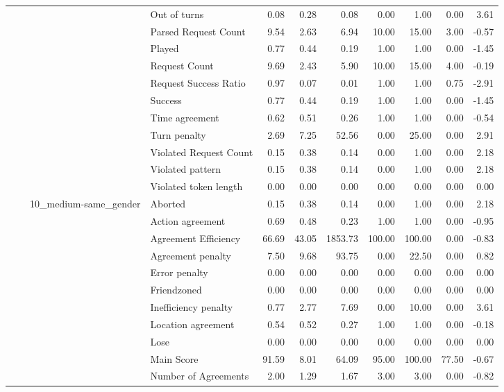 \begin{tabular}{llllrrrrrrr}
 &  &  & Out of turns & 0.08 & 0.28 & 0.08 & 0.00 & 1.00 & 0.00 & 3.61 \\
 &  &  & Parsed Request Count & 9.54 & 2.63 & 6.94 & 10.00 & 15.00 & 3.00 & -0.57 \\
 &  &  & Played & 0.77 & 0.44 & 0.19 & 1.00 & 1.00 & 0.00 & -1.45 \\
 &  &  & Request Count & 9.69 & 2.43 & 5.90 & 10.00 & 15.00 & 4.00 & -0.19 \\
 &  &  & Request Success Ratio & 0.97 & 0.07 & 0.01 & 1.00 & 1.00 & 0.75 & -2.91 \\
 &  &  & Success & 0.77 & 0.44 & 0.19 & 1.00 & 1.00 & 0.00 & -1.45 \\
 &  &  & Time agreement & 0.62 & 0.51 & 0.26 & 1.00 & 1.00 & 0.00 & -0.54 \\
 &  &  & Turn penalty & 2.69 & 7.25 & 52.56 & 0.00 & 25.00 & 0.00 & 2.91 \\
 &  &  & Violated Request Count & 0.15 & 0.38 & 0.14 & 0.00 & 1.00 & 0.00 & 2.18 \\
 &  &  & Violated pattern & 0.15 & 0.38 & 0.14 & 0.00 & 1.00 & 0.00 & 2.18 \\
 &  &  & Violated token length & 0.00 & 0.00 & 0.00 & 0.00 & 0.00 & 0.00 & 0.00 \\
\cline{3-11}
 &  & \multirow[t]{27}{*}{10_medium-same_gender} & Aborted & 0.15 & 0.38 & 0.14 & 0.00 & 1.00 & 0.00 & 2.18 \\
 &  &  & Action agreement & 0.69 & 0.48 & 0.23 & 1.00 & 1.00 & 0.00 & -0.95 \\
 &  &  & Agreement Efficiency & 66.69 & 43.05 & 1853.73 & 100.00 & 100.00 & 0.00 & -0.83 \\
 &  &  & Agreement penalty & 7.50 & 9.68 & 93.75 & 0.00 & 22.50 & 0.00 & 0.82 \\
 &  &  & Error penalty & 0.00 & 0.00 & 0.00 & 0.00 & 0.00 & 0.00 & 0.00 \\
 &  &  & Friendzoned & 0.00 & 0.00 & 0.00 & 0.00 & 0.00 & 0.00 & 0.00 \\
 &  &  & Inefficiency penalty & 0.77 & 2.77 & 7.69 & 0.00 & 10.00 & 0.00 & 3.61 \\
 &  &  & Location agreement & 0.54 & 0.52 & 0.27 & 1.00 & 1.00 & 0.00 & -0.18 \\
 &  &  & Lose & 0.00 & 0.00 & 0.00 & 0.00 & 0.00 & 0.00 & 0.00 \\
 &  &  & Main Score & 91.59 & 8.01 & 64.09 & 95.00 & 100.00 & 77.50 & -0.67 \\
 &  &  & Number of Agreements & 2.00 & 1.29 & 1.67 & 3.00 & 3.00 & 0.00 & -0.82 \\

\end{tabular}
